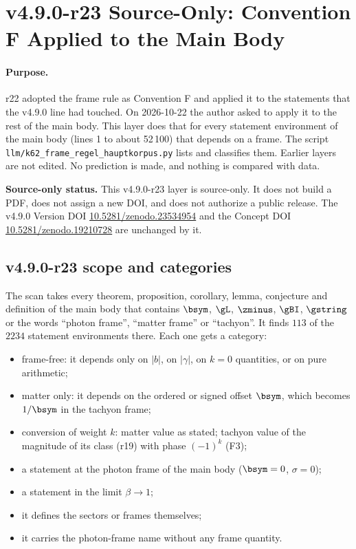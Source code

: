 \clearpage
\section*{v4.9.0-r23 Source-Only: Convention F Applied to the Main Body}
\label{sec:v490-r23-convention-f-main-body}

\paragraph{Purpose.}
r22 adopted the frame rule as Convention F and applied it to the statements that the v4.9.0 line had touched.  On 2026-10-22
the author asked to apply it to the rest of the main body.  This layer does that for every statement environment of the main
body (lines 1 to about 52\,100) that depends on a frame.  The script \texttt{llm/k62\_frame\_regel\_hauptkorpus.py} lists and
classifies them.  Earlier layers are not edited.  No prediction is made, and nothing is compared with data.

\noindent\textbf{Source-only status.}
This v4.9.0-r23 layer is source-only.  It does not build a PDF, does not assign a new DOI,
and does not authorize a public release.  The v4.9.0 Version DOI
\href{https://doi.org/10.5281/zenodo.23534954}{10.5281/zenodo.23534954} and the Concept DOI
\href{https://doi.org/10.5281/zenodo.19210728}{10.5281/zenodo.19210728} are unchanged by it.

\subsection*{v4.9.0-r23 scope and categories}
\label{subsec:v490-r23-scope}

The scan takes every theorem, proposition, corollary, lemma, conjecture and definition of the main body that contains
\(\bsym\), \(\gL\), \(\zminus\), \(\gBI\), \(\gstring\) or the words ``photon frame'', ``matter frame'' or ``tachyon''.  It finds \(113\)
of the \(2234\) statement environments there.  Each one gets a category:
\begin{itemize}[leftmargin=2em]
\item[F] frame-free: it depends only on \(|b|\), on \(|\gamma|\), on \(k=0\) quantities, or on pure arithmetic;
\item[M] matter only: it depends on the ordered or signed offset \(\bsym\), which becomes \(1/\bsym\) in the tachyon frame;
\item[C] conversion of weight \(k\): matter value as stated; tachyon value of the magnitude of its class (r19) with phase \((-1)^k\) (F3);
\item[S] a statement at the photon frame of the main body (\(\bsym=0\), \(\sigma=0\));
\item[P] a statement in the limit \(\beta\to1\);
\item[D] it defines the sectors or frames themselves;
\item[N] it carries the photon-frame name without any frame quantity.
\end{itemize}

